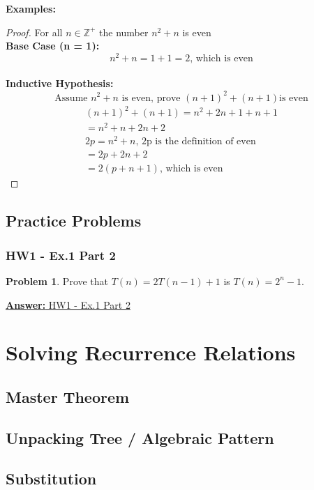 \documentclass[12pt]{article}
\theoremstyle{definition}
\newtheorem{practiceproblem}{Problem}[section]
\def\scratchwork{\vspace*{15em}} %
\def\ghbase{https://github.com/zacktraczyk/CSE102-Midterm-Study-Guide/blob/main/hw\%20answers/}
\newenvironment{problem}[2]
{
	\def\linktext{#1}
	\def\linkdest{\ghbase#2}
	\noindent \begin{minipage}{\textwidth}
		\begin{practiceproblem}
}
{	
		\end{practiceproblem}
		\scratchwork

		\href{\linkdest}{\textbf{Answer:} \linktext}
	\end{minipage}
}
\def\psetone{vaggos\_W\_24\_CSE102\_01\_PSET\_1\_solutions.pdf}
\begin{document}
	\noindent \textbf{Examples:}

	\begin{proof} For all $n \in \mathbb{Z}^+$ the number $n^2 + n$ is even \\
		\textbf{Base Case (n = 1):} 
		$$n^2 + n = 1 + 1 = 2\text{, which is even}$$ \\
		\textbf{Inductive Hypothesis:}
		$$\text{Assume }n^2 + n\text{ is even, prove }(n + 1)^2 + (n + 1)\text{
		is even}$$
		\begin{gather}
			(n + 1)^2 + (n + 1) = n^2 + 2n + 1 + n + 1 \\
			= n^2 + n + 2n + 2 \\
			2p = n^2 + n\text{, 2p is the definition of even} \\
			= 2p + 2n + 2 \\
			= 2(p + n + 1)\text{, which is even}
		\end{gather}
	\end{proof}


	\subsection{Practice Problems}

	\subsubsection{HW1 - Ex.1 Part 2}

	\begin{problem}{HW1 - Ex.1 Part 2}{\psetone}
		Prove that $T(n) = 2T(n - 1) + 1$ is $T(n) = 2^n - 1$.
	\end{problem}


	\section{Solving Recurrence Relations}

	\subsection{Master Theorem}

	\subsection{Unpacking Tree / Algebraic Pattern}

	\subsection{Substitution}
\end{document}
